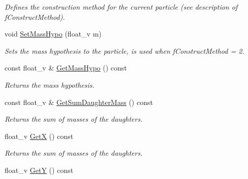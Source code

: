 \begin{DoxyCompactItemize}
\begin{DoxyCompactList}\small\item\em Defines the construction method for the current particle (see description of f\+Construct\+Method). \end{DoxyCompactList}\item 
void \hyperlink{classKFParticleBaseSIMD_a85cd002f960edc11de214421f0ec00b4}{Set\+Mass\+Hypo} (float\+\_\+v m)\hypertarget{classKFParticleBaseSIMD_a85cd002f960edc11de214421f0ec00b4}{}\label{classKFParticleBaseSIMD_a85cd002f960edc11de214421f0ec00b4}

\begin{DoxyCompactList}\small\item\em Sets the mass hypothesis to the particle, is used when f\+Construct\+Method = 2. \end{DoxyCompactList}\item 
const float\+\_\+v \& \hyperlink{classKFParticleBaseSIMD_ab30c31111824d87b88bfc02c53fcaec1}{Get\+Mass\+Hypo} () const \hypertarget{classKFParticleBaseSIMD_ab30c31111824d87b88bfc02c53fcaec1}{}\label{classKFParticleBaseSIMD_ab30c31111824d87b88bfc02c53fcaec1}

\begin{DoxyCompactList}\small\item\em Returns the mass hypothesis. \end{DoxyCompactList}\item 
const float\+\_\+v \& \hyperlink{classKFParticleBaseSIMD_a3b50e6fdc8b56aed187da4eec3936afe}{Get\+Sum\+Daughter\+Mass} () const \hypertarget{classKFParticleBaseSIMD_a3b50e6fdc8b56aed187da4eec3936afe}{}\label{classKFParticleBaseSIMD_a3b50e6fdc8b56aed187da4eec3936afe}

\begin{DoxyCompactList}\small\item\em Returns the sum of masses of the daughters. \end{DoxyCompactList}\item 
float\+\_\+v \hyperlink{classKFParticleBaseSIMD_a6b2c3d26757c9d1b1ac2f2dbaa0b3415}{GetX} () const \hypertarget{classKFParticleBaseSIMD_a6b2c3d26757c9d1b1ac2f2dbaa0b3415}{}\label{classKFParticleBaseSIMD_a6b2c3d26757c9d1b1ac2f2dbaa0b3415}

\begin{DoxyCompactList}\small\item\em Returns the sum of masses of the daughters. \end{DoxyCompactList}\item 
float\+\_\+v \hyperlink{classKFParticleBaseSIMD_a2bec26d0571f001feb2288519aa2ca67}{GetY} () const \hypertarget{classKFParticleBaseSIMD_a2bec26d0571f001feb2288519aa2ca67}{}\label{classKFParticleBaseSIMD_a2bec26d0571f001feb2288519aa2ca67}


\end{DoxyCompactItemize}
